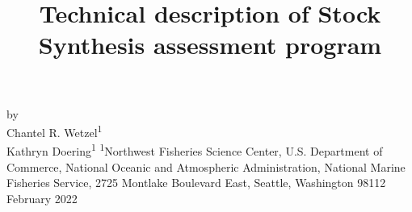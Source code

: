 \documentclass[11pt,
  english,
  letterpaper,
]{article}
\date{}
\newcommand{\trTitle}{Technical description of Stock Synthesis assessment program}
\newcommand{\trYear}{2022}
\newcommand{\trMonth}{February}
\newcommand{\trAuthsBack}{Wetzel, C.R., K.L. Doering}
\newcommand{\trCitation}{
\begin{hangparas}{1em}{1}
\trAuthsBack{}. \trYear{}. \trTitle{}. \glsentrylong{pfmc}, Portland, Oregon. \pageref{LastPage}{}\,p.
\end{hangparas}}
\begin{document}

\renewcommand*{\thefootnote}{\fnsymbol{footnote}}

\small
\thispagestyle{empty}
\noindent
\begin{center}
\title{Technical description of Stock Synthesis assessment program}
\vspace{1.5cm}
{\Large\textbf{}}
\vfill
by\\
Chantel R. Wetzel\textsuperscript{1}\\
Kathryn Doering\textsuperscript{1}\vfill
\textsuperscript{1}Northwest Fisheries Science Center, U.S. Department of Commerce, National Oceanic and Atmospheric Administration, National Marine Fisheries Service, 2725 Montlake Boulevard East, Seattle, Washington 98112\vfill
\trMonth{} \trYear{}
\end{center}
\clearpage



\tableofcontents\clearpage
\label{TRlastRoman}
\clearpage

\newpage
\thispagestyle{empty} %

\pagestyle{plain}  %
\renewcommand*{\thefootnote}{\arabic{footnote}}  %
\setcounter{footnote}{0}  %
\renewcommand{\headrulewidth}{0.5pt}
\renewcommand{\footrulewidth}{0.5pt}

\newcommand{\lt}{\ensuremath <}
\newcommand{\gt}{\ensuremath >}
\end{document}
